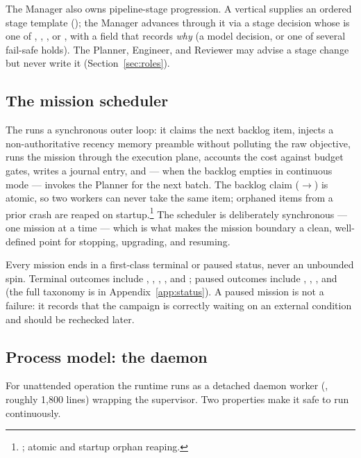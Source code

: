 The Manager also owns pipeline-stage progression. A vertical supplies an ordered
stage template (); the Manager advances 
through it via a stage decision whose  is one of ,
, , or , with a  field that
records \emph{why} (a model decision, or one of several fail-safe holds). The
Planner, Engineer, and Reviewer may advise a stage change but never write it
(Section~\ref{sec:roles}).

\subsection{The mission scheduler}

The  runs a synchronous outer loop: it claims the next
backlog item, injects a non-authoritative recency memory preamble without
polluting the raw objective, runs the mission through the execution plane,
accounts the cost against budget gates, writes a journal entry, and --- when the
backlog empties in continuous mode --- invokes the Planner for the next batch. The
backlog claim ($\rightarrow$) is atomic, so two
workers can never take the same item; orphaned  items from a prior
crash are reaped on startup.\footnote{;
atomic  and startup orphan reaping.} The scheduler is
deliberately synchronous --- one mission at a time --- which is what makes the
mission boundary a clean, well-defined point for stopping, upgrading, and
resuming.

Every mission ends in a first-class terminal or paused status, never an
unbounded spin. Terminal outcomes include , ,
, , and ; paused outcomes
include , ,
, and  (the full taxonomy is in
Appendix~\ref{app:status}). A paused mission is not a failure: it records that
the campaign is correctly waiting on an external condition and should be rechecked
later.

\subsection{Process model: the daemon}

For unattended operation the runtime runs as a detached daemon worker
(, roughly 1{,}800 lines) wrapping the
supervisor. Two properties make it safe to run continuously.

